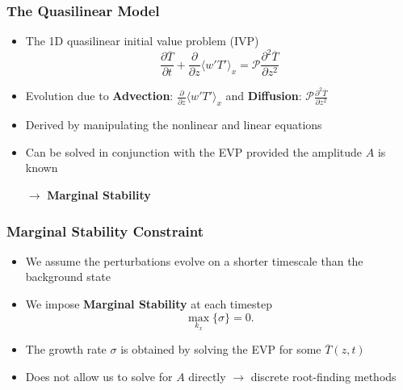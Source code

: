 \begin{frame}[fragile]
    \frametitle{The Quasilinear Model}
    \begin{itemize}
        \item The 1D quasilinear initial value problem (IVP)
        \begin{equation}
            \frac{\partial \overline{T}}{\partial t} + \frac{\partial}{\partial z} \langle w'T' \rangle_x = \mathcal{P} \frac{\partial^2 \overline{T}}{\partial z^2} \label{EQ:T0_IVP}
        \end{equation}
        \item Evolution due to \textbf{Advection}: $\frac{\partial}{\partial z} \langle w'T' \rangle_x $
        and \textbf{Diffusion}: $\mathcal{P} \frac{\partial^2 \overline{T}}{\partial z^2}$\newline

        \item Derived by manipulating the nonlinear and linear equations\newline
        
        \item Can be solved in conjunction with the EVP provided the amplitude $A$ is known\newline
        
        \hspace{0.5cm} $\mathbf{\longrightarrow}$ \textbf{Marginal Stability}

    \end{itemize}
    
    
\end{frame}

\begin{frame}[fragile]
    \frametitle{Marginal Stability Constraint}
    \begin{itemize}
        \item We assume the perturbations evolve on a shorter timescale than the background state\newline
        
        \item We impose \textbf{Marginal Stability} at each timestep
        \begin{equation}
            \max_{k_x} \{ \sigma \} = 0.
        \end{equation}

        \item The growth rate $\sigma$ is obtained by solving the EVP for some $\overline{T}(z,t)$\newline
        
        \item Does not allow us to solve for $A$ directly $\longrightarrow$ discrete root-finding methods
    \end{itemize}
    
\end{frame}

